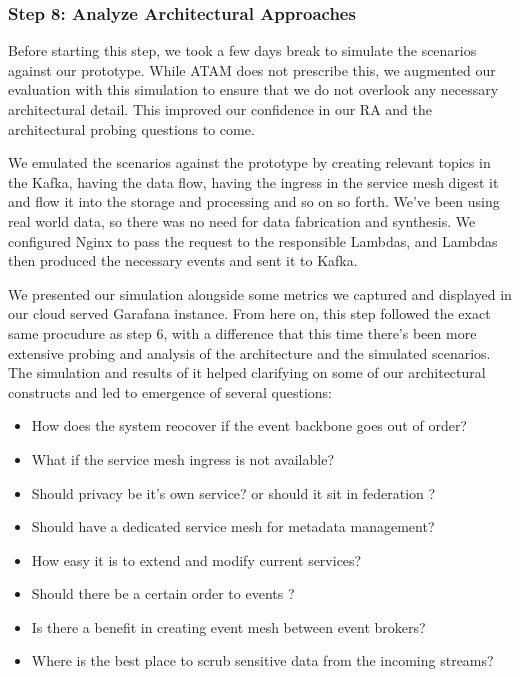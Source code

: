 \documentclass[review]{elsarticle}
\begin{document}
\subsubsection{Step 8: Analyze Architectural Approaches}

Before starting this step, we took a few days break to simulate the scenarios against our prototype. While ATAM does not prescribe this, we augmented our evaluation with this simulation to ensure that we do not overlook any necessary architectural detail. This improved our confidence in our RA and the architectural probing questions to come. 

We emulated the scenarios against the prototype by creating relevant topics in the Kafka, having the data flow, having the ingress in the service mesh digest it and flow it into the storage and processing and so on so forth. We've been using real world data, so there was no need for data fabrication and synthesis. We configured Nginx to pass the request to the responsible Lambdas, and Lambdas then produced the necessary events and sent it to Kafka. 

We presented our simulation alongside some metrics we captured and displayed in our cloud served Garafana instance. From here on, this step followed the exact same procudure as step 6, with a difference that this time there's been more extensive probing and analysis of the architecture and the simulated scenarios. The simulation and results of it helped clarifying on some of our architectural constructs and led to emergence of several questions: 

\begin{itemize}
    \item How does the system reocover if the event backbone goes out of order?
    \item What if the service mesh ingress is not available?
    \item Should privacy be it's own service? or should it sit in federation ?
    \item Should have a dedicated service mesh for metadata management?
    \item How easy it is to extend and modify current services?
    \item Should there be a certain order to events ?
    \item Is there a benefit in creating event mesh between event brokers?
    \item Where is the best place to scrub sensitive data from the incoming streams?
\end{itemize}
\end{document}
